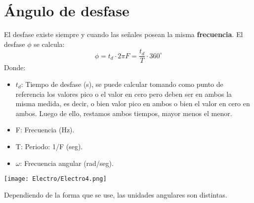 \documentclass[
	12pt, %
	fleqn, %
	a4paper, %
	oneside, %
]{LegrandOrangeBook}
\begin{document}
\section{Ángulo de desfase}
\begin{definition}
El desfase existe siempre y cuando las señales posean la misma \textbf{frecuencia}.
El desfase $\phi$ se calcula:
\begin{equation}
\phi=t_d\cdot 2\pi F=\frac{t_d}{T}\cdot 360^{\circ}
\label{eq:desfase}
\end{equation}
Donde:
\begin{itemize}
\item $t_d$: Tiempo de desfase (s), se puede calcular tomando como punto de referencia los valores pico o el valor en cero pero deben ser en ambos la misma medida, es decir, o bien valor pico en ambos o bien el valor en cero en ambos. Luego de ello, restamos ambos tiempos, mayor menos el menor.
\item F: Frecuencia (Hz).
\item T: Periodo: 1/F (seg).
\item $\omega$: Frecuencia angular (rad/seg).
\end{itemize}
\begin{center}
\texttt{[image: Electro/Electro4.png]}
\end{center}
Dependiendo de la forma que se use, las unidades angulares son distintas.
\end{definition}
%
%
%
%
%
\end{document}
